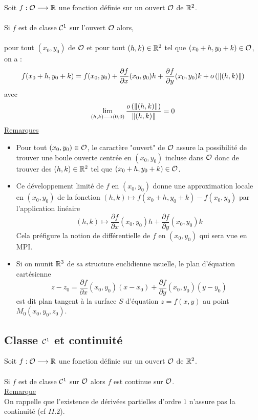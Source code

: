\begin{defprop}
    Soit \(f : \cal{O} \to  \R\) une fonction définie sur un ouvert \(\cal{O}\) de \(\R^2\).\\~\\
    Si \(f\) est de classe \(\cal{C}^{1}\) sur l’ouvert \(\cal{O}\) alors,\\~\\
    pour tout \((x_0, y_0)\) de \(\cal{O}\) et pour tout \((h, k) \in \R^2\) tel que \((x_0 + h, y_0 + k) \in \cal{O}\), on a :
    \[f (x_0 + h, y_0 + k) = f (x_0, y_0) + \frac{\partial f}{\partial x} (x_0, y_0) h + \frac{\partial f}{\partial y} (x_0, y_0) k + \o{\norme{(h, k)}}\]
    avec \[\lim_{(h,k)\to (0,0)} \frac{\o{\norme{(h, k)}}}{\norme{(h, k)}} = 0\]
    \underline{Remarques}\\
    \begin{itemize}
        \item Pour tout \((x_0, y_0) \in \cal{O}\), le caractère "ouvert" de \(\cal{O}\) assure la possibilité de trouver une boule ouverte centrée en \((x_0, y_0)\) incluse dans \(\cal{O} \) donc de trouver des \((h, k) \in \R^2\) tel que \((x_0 + h, y_0 + k) \in \cal{O}\).
        \item Ce développement limité de \(f\) en \((x_0, y_0)\) donne une approximation locale en \((x_0, y_0)\) de la fonction \((h, k) \mapsto f (x_0 + h, y_0 + k) - f (x_0, y_0)\) par l’application linéaire
        \[ (h, k) \mapsto \frac{\partial f}{\partial x} (x_0, y_0) h + \frac{\partial f}{\partial y} (x_0, y_0) k\]
        Cela préfigure la notion de différentielle de \(f\) en \((x_0, y_0)\) qui sera vue en MPI.
        \item Si on munit \(\R^3\) de sa structure euclidienne usuelle, le plan d’équation cartésienne
        \[z - z_0 = \frac{\partial f}{\partial x} (x_0, y_0) (x - x_0) + \frac{\partial f}{\partial y} (x_0, y_0) (y - y_0)\]
        est dit plan tangent à la surface \(S\) d’équation \(z = f (x, y)\) au point \(M_0(x_0, y_0, z_0)\).
    \end{itemize}
\end{defprop}
\subsection{Classe \(\cal{C}^{1}\) et continuité}
\begin{defprop}
    Soit \(f : \cal{O} \to  \R\) une fonction définie sur un ouvert \(\cal{O}\) de \(\R^2\).\\~\\
    Si \(f\) est de classe \(\cal{C}^{1}\) sur \(\cal{O}\) alors \(f\) est continue sur \(\cal{O}\).\\
    \underline{Remarque}\\
    On rappelle que l’existence de dérivées partielles d’ordre \(1\) n’assure pas la continuité (cf \(II. 2\)).
\end{defprop}
